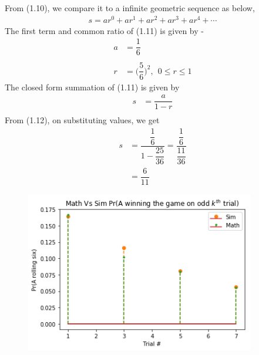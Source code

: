 \documentclass[journal,12pt,twocolumn]{IEEEtran}
\begin{document}
From (1.10), we compare it to a infinite geometric sequence as below,\\
\begin{equation}\tag{1.11}
    \begin{split}
        s = ar^0 + ar^1 + ar^2 + ar^3 + ar^4 + \cdots
    \end{split}
\end{equation}
The first term and common ratio of (1.11) is given by - 
\begin{equation}\tag{1.11}
    \begin{split}
        a &= \dfrac{1}{6}
        \\
        \\
        r &= \Big(\dfrac{5}{6}\Big)^{2}, \ \ 0 \leq r \leq 1
    \end{split}
\end{equation}
The closed form summation of (1.11) is given by \\
\begin{equation}\tag{1.12}
    \begin{split}
        s &= \dfrac{a}{1 - r}\\
    \end{split}
\end{equation}
From (1.12), on substituting values, we get
\begin{equation}\tag{1.13}
    \begin{split}
        s &= \dfrac{\dfrac{1}{6}}{1 - \dfrac{25}{36}} = \dfrac{\dfrac{1}{6}}{\dfrac{11}{36}}\\
          &= \dfrac{6}{11}
    \end{split}
\end{equation}
\begin{figure}[h!]
    \includegraphics[width=10cm]{Assignment-11/Code/Figure/plot.png}
\end{figure}
\end{document}
